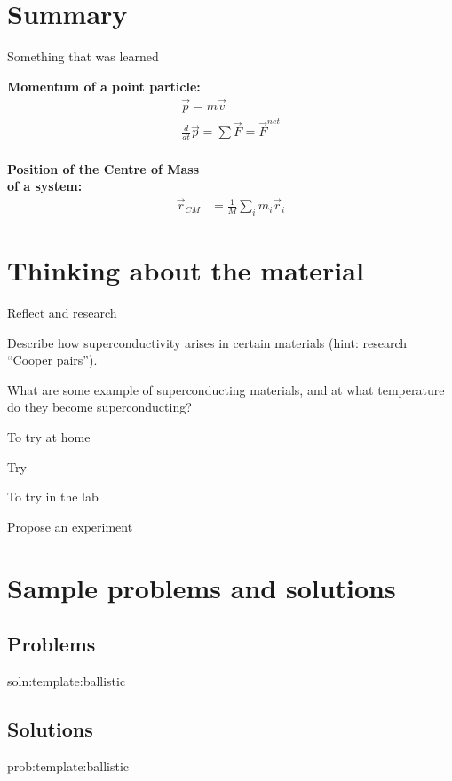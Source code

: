 \newpage
\section{Summary}

\begin{chapterSummary}
 Something that was learned
\end{chapterSummary}

\newpage
\begin{importantEquations}
\medskip
\begin{multicols}{2}
\textbf{Momentum of a point particle:}
\begin{align*}
\vec p = m\vec v \\
\frac{d}{dt}\vec p = \sum \vec F = \vec F^{net}
\end{align*}
\columnbreak
\\
\textbf{Position of the Centre of Mass \\ of a system:}
\begin{align*}
\vec r_{CM} &=\frac{1}{M}\sum_i m_i\vec r_i 
\end{align*}
\medskip
\end{multicols}
\end{importantEquations}

\newpage
\section{Thinking about the material}

\begin{chapteractivity}{Reflect and research}
{
\item Describe how superconductivity arises in certain materials (hint: research ``Cooper pairs'').
\item What are some example of superconducting materials, and at what temperature do they become superconducting?
}
\end{chapteractivity}

\begin{chapteractivity}{To try at home}
{
\item Try
}
\end{chapteractivity}

\begin{chapteractivity}{To try in the lab}
{
\item Propose an experiment
}
\end{chapteractivity}

\newpage
\section{Sample problems and solutions}
\subsection{Problems}
\begin{problem}{soln:template:ballistic}{\label{prob:template:ballistic} 

}
\end{problem}

\newpage
\subsection{Solutions}
\begin{solution}{prob:template:ballistic}\label{soln:template:ballistic}

\end{solution}

